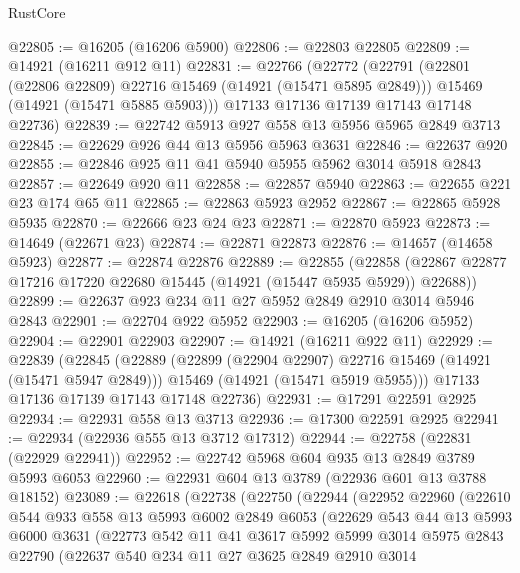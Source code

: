 \begin{lexlean}{RustCore}
\begin{coremodule}
@22805 := @16205 (@16206 @5900)
@22806 := @22803 @22805
@22809 := @14921 (@16211 @912 @11)
@22831 := @22766
    (@22772
      (@22791
        (@22801 (@22806 @22809) @22716 @15469 (@14921 (@15471 @5895 @2849)))
        @15469
        (@14921 (@15471 @5885 @5903)))
      @17133
      @17136
      @17139
      @17143
      @17148
      @22736)
@22839 := @22742 @5913 @927 @558 @13 @5956 @5965 @2849 @3713
@22845 := @22629 @926 @44 @13 @5956 @5963 @3631
@22846 := @22637 @920
@22855 := @22846 @925 @11 @41 @5940 @5955 @5962 @3014 @5918 @2843
@22857 := @22649 @920 @11
@22858 := @22857 @5940
@22863 := @22655 @221 @23 @174 @65 @11
@22865 := @22863 @5923 @2952
@22867 := @22865 @5928 @5935
@22870 := @22666 @23 @24 @23
@22871 := @22870 @5923
@22873 := @14649 (@22671 @23)
@22874 := @22871 @22873
@22876 := @14657 (@14658 @5923)
@22877 := @22874 @22876
@22889 := @22855
    (@22858 (@22867 @22877 @17216 @17220 @22680 @15445 (@14921 (@15447 @5935 @5929)) @22688))
@22899 := @22637 @923 @234 @11 @27 @5952 @2849 @2910 @3014 @5946 @2843
@22901 := @22704 @922 @5952
@22903 := @16205 (@16206 @5952)
@22904 := @22901 @22903
@22907 := @14921 (@16211 @922 @11)
@22929 := @22839
    (@22845
      (@22889
        (@22899 (@22904 @22907) @22716 @15469 (@14921 (@15471 @5947 @2849)))
        @15469
        (@14921 (@15471 @5919 @5955)))
      @17133
      @17136
      @17139
      @17143
      @17148
      @22736)
@22931 := @17291 @22591 @2925
@22934 := @22931 @558 @13 @3713
@22936 := @17300 @22591 @2925
@22941 := @22934 (@22936 @555 @13 @3712 @17312)
@22944 := @22758 (@22831 (@22929 @22941))
@22952 := @22742 @5968 @604 @935 @13 @2849 @3789 @5993 @6053
@22960 := @22931 @604 @13 @3789 (@22936 @601 @13 @3788 @18152)
@23089 := @22618
    (@22738
      (@22750
        (@22944
          (@22952
            @22960
            (@22610
              @544
              @933
              @558
              @13
              @5993
              @6002
              @2849
              @6053
              (@22629
                @543
                @44
                @13
                @5993
                @6000
                @3631
                (@22773
                  @542
                  @11
                  @41
                  @3617
                  @5992
                  @5999
                  @3014
                  @5975
                  @2843
                  @22790
                  (@22637
                    @540
                    @234
                    @11
                    @27
                    @3625
                    @2849
                    @2910
                    @3014

\end{coremodule}
\end{lexlean}
